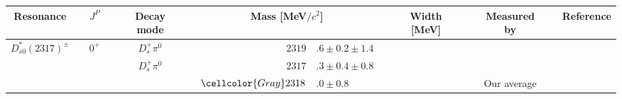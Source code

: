 \begin{adjustbox}{width=\textwidth,center}
{\setlength\tabcolsep{0pt}
	\begin{tabular}{cp{5pt}cp{5pt}cp{5pt}r@{}lp{5pt}r@{}lp{5pt}cp{5pt}c}
	\toprule
	\rowcolor{Gray} Resonance                 && $J^{P}$                   && Decay mode                                                         && \multicolumn{2}{c}{Mass [MeV$/c^{2}$]} && \multicolumn{2}{c}{Width [MeV]}      && \multicolumn{1}{c}{Measured by} && \multicolumn{1}{c}{Reference} 
	\\ \midrule
	\multirow{3}{*}{$D_{s0}^{*}(2317)^{\pm}$}	&&	\multirow{3}{*}{$0^{+}$}	&&	$D_{s}^{+}\pi^{0}$	&&$	2319$&$.6\pm0.2\pm1.4	$&&$	$&$	$&&	\babar{}	&&	\cite{Aubert:2006bk}          \\
		&&		&&	$D_{s}^{+}\pi^{0}$	&&$	2317$&$.3\pm0.4\pm0.8	$&&$	$&$	$&&	\babar{}	&&	\cite{Aubert:2003pe}          \\  \cmidrule{6-14}
		&&		&&		&\cellcolor{Gray}&$	\cellcolor{Gray}  2318$&\cellcolor{Gray}$.0 \pm 0.8	$&\cellcolor{Gray}&	\cellcolor{Gray}&\cellcolor{Gray}	&\cellcolor{Gray}&	\cellcolor{Gray} Our average	&\cellcolor{Gray}&	\\ \midrule
													

\end{tabular}}
\end{adjustbox}

